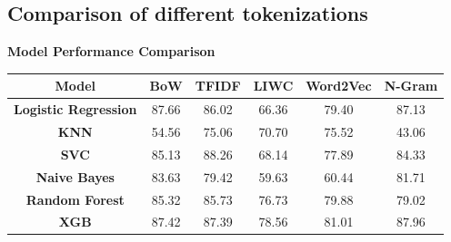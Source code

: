\subsection{Comparison of different tokenizations}
\begin{center}
    \textbf{Model Performance Comparison} \\[0.5em]
    \begin{tabular}{|c|c|c|c|c|c|}
        \hline
        \textbf{Model} & \textbf{BoW} & \textbf{TFIDF} & \textbf{LIWC} & \textbf{Word2Vec} & \textbf{N-Gram} \\ \hline
        \textbf{Logistic Regression} & 87.66 & 86.02 & 66.36 & 79.40 & 87.13 \\ \hline
        \textbf{KNN} & 54.56 & 75.06 & 70.70 & 75.52 & 43.06 \\ \hline
        \textbf{SVC} & 85.13 & 88.26 & 68.14 & 77.89 & 84.33 \\ \hline
        \textbf{Naive Bayes} & 83.63 & 79.42 & 59.63 & 60.44 & 81.71 \\ \hline
        \textbf{Random Forest} & 85.32 & 85.73 & 76.73 & 79.88 & 79.02 \\ \hline
        \textbf{XGB} & 87.42 & 87.39 & 78.56 & 81.01 & 87.96 \\ \hline
    \end{tabular}
\end{center}

